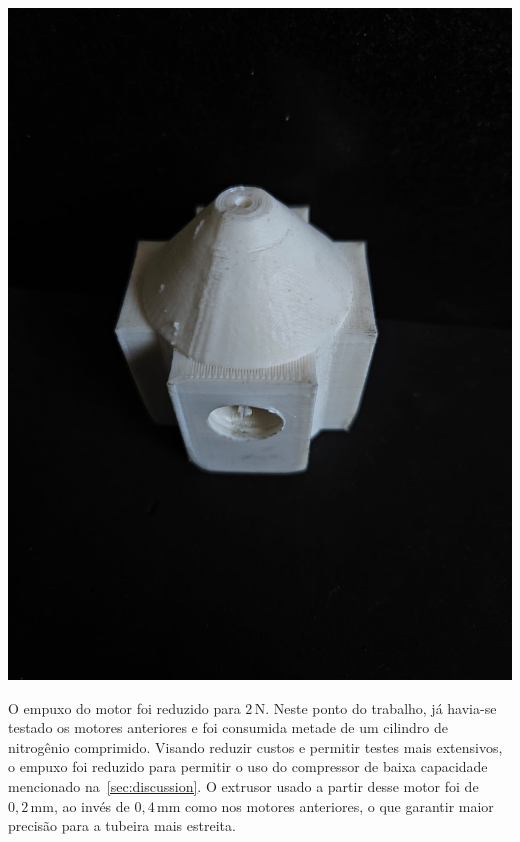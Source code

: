 \begin{minipage}{.49\textwidth}
    \includegraphics[width=\textwidth]{img/app_dev_history/motor5.jpeg}
\end{minipage}
\begin{minipage}{.49\textwidth}
    O empuxo do motor foi reduzido para \(2\,\mathrm{N}\). Neste ponto do trabalho, já havia-se testado os motores anteriores e foi consumida metade de um cilindro de nitrogênio comprimido. Visando reduzir custos e permitir testes mais extensivos, o empuxo foi reduzido para permitir o uso do compressor de baixa capacidade mencionado na~\ref{sec:discussion}. O extrusor usado a partir desse motor foi de \(0,2\,\mathrm{mm}\), ao invés de \(0,4\,\mathrm{mm}\) como nos motores anteriores, o que garantir maior precisão para a tubeira mais estreita. 
\end{minipage}

